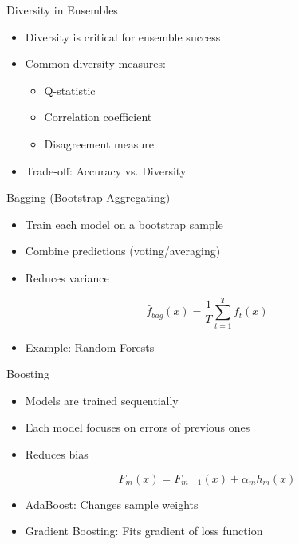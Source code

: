 \documentclass{beamer}
\begin{document}
\begin{frame}{Diversity in Ensembles}
\begin{itemize}
    \item Diversity is critical for ensemble success
    \item Common diversity measures:
    \begin{itemize}
        \item Q-statistic
        \item Correlation coefficient
        \item Disagreement measure
    \end{itemize}
    \item Trade-off: Accuracy vs. Diversity
\end{itemize}
\end{frame}

\begin{frame}{Bagging (Bootstrap Aggregating)}
\begin{itemize}
    \item Train each model on a bootstrap sample
    \item Combine predictions (voting/averaging)
    \item Reduces variance
\end{itemize}
\[
\hat{f}_{bag}(x) = \frac{1}{T} \sum_{t=1}^{T} f_t(x)
\]
\begin{itemize}
    \item Example: Random Forests
\end{itemize}
\end{frame}

\begin{frame}{Boosting}
\begin{itemize}
    \item Models are trained sequentially
    \item Each model focuses on errors of previous ones
    \item Reduces bias
\end{itemize}
\[
F_m(x) = F_{m-1}(x) + \alpha_m h_m(x)
\]
\begin{itemize}
    \item AdaBoost: Changes sample weights
    \item Gradient Boosting: Fits gradient of loss function
\end{itemize}
\end{frame}
\end{document}
